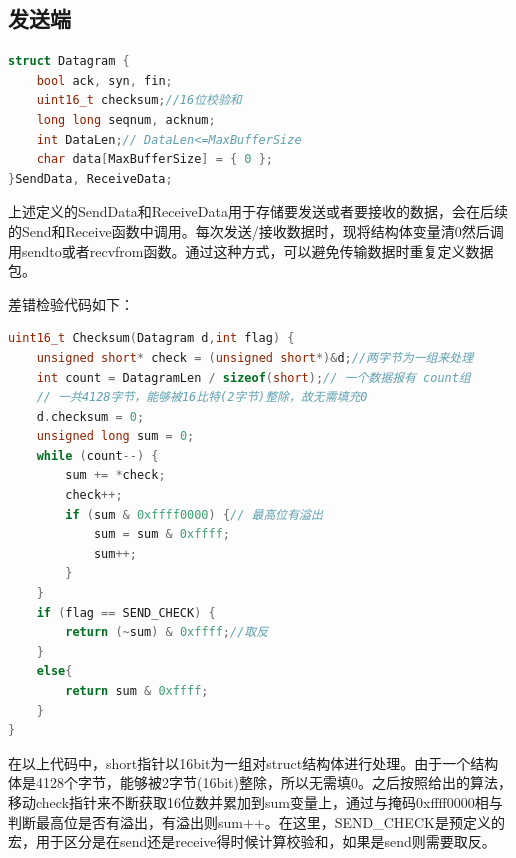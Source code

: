 \documentclass[UTF8,a4paper,10pt]{ctexart}
\begin{document}
\subsection{发送端}
\begin{lstlisting}[frame=trbl,language={C++}]
struct Datagram {
    bool ack, syn, fin;
    uint16_t checksum;//16位校验和
    long long seqnum, acknum;
    int DataLen;// DataLen<=MaxBufferSize
    char data[MaxBufferSize] = { 0 };
}SendData, ReceiveData;
\end{lstlisting}\par
上述定义的SendData和ReceiveData用于存储要发送或者要接收的数据，会在后续的Send和Receive函数中调用。每次发送/接收数据时，现将结构体变量清0然后调用sendto或者recvfrom函数。通过这种方式，可以避免传输数据时重复定义数据包。\par
差错检验代码如下：
\begin{lstlisting}[frame=trbl,language={C++}]
uint16_t Checksum(Datagram d,int flag) {
    unsigned short* check = (unsigned short*)&d;//两字节为一组来处理
    int count = DatagramLen / sizeof(short);// 一个数据报有 count组
    // 一共4128字节，能够被16比特(2字节)整除，故无需填充0
    d.checksum = 0;
    unsigned long sum = 0;
    while (count--) {
        sum += *check;
        check++;
        if (sum & 0xffff0000) {// 最高位有溢出
            sum = sum & 0xffff;
            sum++;
        }
    }
    if (flag == SEND_CHECK) {
        return (~sum) & 0xffff;//取反
    }
    else{
        return sum & 0xffff;
    }
}
\end{lstlisting}\par
在以上代码中，short指针以16bit为一组对struct结构体进行处理。由于一个结构体是4128个字节，能够被2字节(16bit)整除，所以无需填0。之后按照给出的算法，移动check指针来不断获取16位数并累加到sum变量上，通过与掩码0xffff0000相与判断最高位是否有溢出，有溢出则sum++。在这里，SEND\_CHECK是预定义的宏，用于区分是在send还是receive得时候计算校验和，如果是send则需要取反。\par
\end{document}
